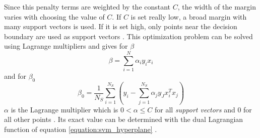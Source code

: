 Since this penalty terms are weighted by the constant $C$, the width of the margin varies with choosing the value of $C$.
If $C$ is set really low, a broad margin with many support vectors is used.
If it is set high, only points near the decision boundary are used as support vectors \cite[p.421]{Hastie2009}.
This optimization problem can be solved using Lagrange multipliers and gives for $\beta$
\begin{equation}
    \beta = \sum_{i=1}^{N} \alpha_i y_i x_i
\end{equation}
and for $\beta_0$
\begin{equation}
    \beta_0 = \frac{1}{N_S} \sum_{i=1}^{N_S}(y_i - \sum_{j=1}^{N_S} \alpha_j y_J x_i^T x_j)
\end{equation}
$\alpha$ is the Lagrange multiplier which is $0 < \alpha \leq C$ for all \textit{support vectors} and $0$ for all other points \cite[p. 746]{Russel2016}.
Its exact value can be determined with the dual Lagrangian function of equation \ref{equation:svm_hyperplane} \cite[p. 9]{Fletcher2008}.

